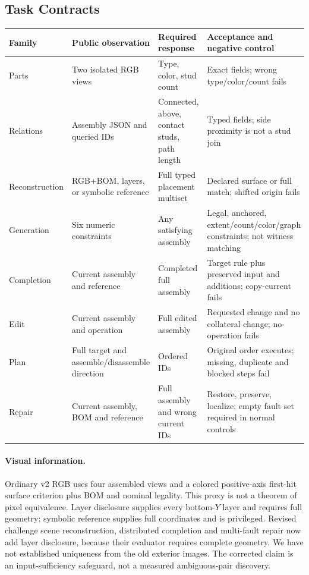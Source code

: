\subsection{Task Contracts}
\begin{tabularx}{\textwidth}{@{}lXXX@{}}
\toprule
Family & Public observation & Required response & Acceptance and negative control\\
\midrule
Parts & Two isolated RGB views & Type, color, stud count & Exact fields; wrong type/color/count fails\\
Relations & Assembly JSON and queried IDs & Connected, above, contact studs, path length & Typed fields; side proximity is not a stud join\\
Reconstruction & RGB+BOM, layers, or symbolic reference & Full typed placement multiset & Declared surface or full match; shifted origin fails\\
Generation & Six numeric constraints & Any satisfying assembly & Legal, anchored, extent/count/color/graph constraints; not witness matching\\
Completion & Current assembly and reference & Completed full assembly & Target rule plus preserved input and additions; copy-current fails\\
Edit & Current assembly and operation & Full edited assembly & Requested change and no collateral change; no-operation fails\\
Plan & Full target and assemble/disassemble direction & Ordered IDs & Original order executes; missing, duplicate and blocked steps fail\\
Repair & Current assembly, BOM and reference & Full assembly and wrong current IDs & Restore, preserve, localize; empty fault set required in normal controls\\
\bottomrule
\end{tabularx}

\paragraph{Visual information.}
Ordinary v2 RGB uses four assembled views and a colored positive-axis first-hit
surface criterion plus BOM and nominal legality. This proxy is not a theorem of
pixel equivalence. Layer disclosure supplies every bottom-$Y$ layer and requires
full geometry; symbolic reference supplies full coordinates and is privileged.
Revised challenge scene reconstruction, distributed completion and multi-fault
repair now add layer disclosure, because their evaluator requires complete geometry.
We have not established uniqueness from the old exterior images. The corrected
claim is an input-sufficiency safeguard, not a measured ambiguous-pair discovery.

